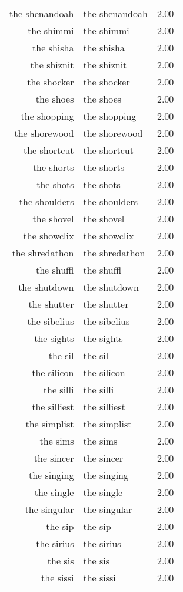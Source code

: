 \begin{table}[ht]
\begin{tabular}{rlr}
  the shenandoah & the shenandoah & 2.00 \\ 
  the shimmi & the shimmi & 2.00 \\ 
  the shisha & the shisha & 2.00 \\ 
  the shiznit & the shiznit & 2.00 \\ 
  the shocker & the shocker & 2.00 \\ 
  the shoes & the shoes & 2.00 \\ 
  the shopping & the shopping & 2.00 \\ 
  the shorewood & the shorewood & 2.00 \\ 
  the shortcut & the shortcut & 2.00 \\ 
  the shorts & the shorts & 2.00 \\ 
  the shots & the shots & 2.00 \\ 
  the shoulders & the shoulders & 2.00 \\ 
  the shovel & the shovel & 2.00 \\ 
  the showclix & the showclix & 2.00 \\ 
  the shredathon & the shredathon & 2.00 \\ 
  the shuffl & the shuffl & 2.00 \\ 
  the shutdown & the shutdown & 2.00 \\ 
  the shutter & the shutter & 2.00 \\ 
  the sibelius & the sibelius & 2.00 \\ 
  the sights & the sights & 2.00 \\ 
  the sil & the sil & 2.00 \\ 
  the silicon & the silicon & 2.00 \\ 
  the silli & the silli & 2.00 \\ 
  the silliest & the silliest & 2.00 \\ 
  the simplist & the simplist & 2.00 \\ 
  the sims & the sims & 2.00 \\ 
  the sincer & the sincer & 2.00 \\ 
  the singing & the singing & 2.00 \\ 
  the single & the single & 2.00 \\ 
  the singular & the singular & 2.00 \\ 
  the sip & the sip & 2.00 \\ 
  the sirius & the sirius & 2.00 \\ 
  the sis & the sis & 2.00 \\ 
  the sissi & the sissi & 2.00 \\ 

\end{tabular}
\end{table}
